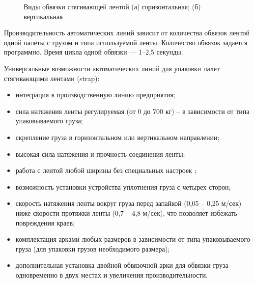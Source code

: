 \begin{figure}[ht]
    \qquad
    \caption{Виды обвязки стягивающей лентой (а) горизонтальная; (б) вертикальная}
    \label{fig:tight}
\end{figure}

Производительность автоматических линий зависит от количества обвязок лентой одной палеты с грузом и типа используемой ленты. Количество обвязок задается программно. Время цикла одной обвязки --- 1--2,5 секунды.

Универсальные возможности автоматических линий для упаковки палет стягивающими лентами (strap):

\begin{itemize}
    \item интеграция в производственную линию предприятия; 
    \item сила натяжения ленты регулируемая (от 0 до 700 кг) – в зависимости от типа упаковываемого груза; 
    \item скрепление груза в горизонтальном или вертикальном направлении; 
    \item высокая сила натяжения и прочность соединения ленты; 
    \item работа с лентой любой ширины без специальных настроек ;
    \item возможность установки устройства уплотнения груза с четырех сторон;
    \item скорость натяжения ленты вокруг груза перед запайкой (0,05 – 0,25 м/сек) ниже скорости протяжки ленты (0,7 – 4,8 м/сек), что позволяет избежать повреждения краев; 
    \item комплектация арками любых размеров в зависимости от типа упаковываемого груза (для упаковки грузов необходимого размера); 
    \item дополнительная установка двойной обвязочной арки для обвязки груза одновременно в двух местах и увеличения производительности. 
\end{itemize}

